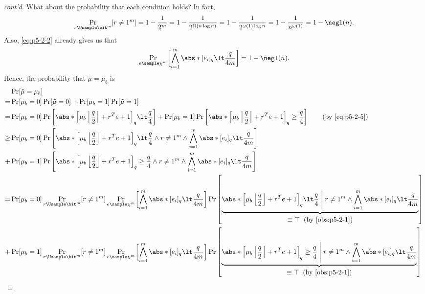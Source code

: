 \begin{answer}[ii]
\begin{proof}[cont'd]
        What about the probability that each condition holds? In fact, 
        \begin{equation}\label{eq:p5-2-8}
            \Pr_{r\Usample\bit^m}[r\neq 1^m] = 1-\frac{1}{2^m}=1-\frac{1}{2^{\Omega(n\log n)}}
            =1-\frac{1}{2^{\omega(1)\log{n}}}=1-\frac{1}{n^{\omega(1)}}=1-\negl(n).
        \end{equation}
        Also, \eqref{eq:p5-2-2} already gives us that
        \begin{equation}\label{eq:p5-2-9}
            \Pr_{e\sample\chi^m}\biggl[ \bigwedge_{i=1}^m \abs*{[e_i]_q} \lt \frac{q}{4m}\biggr] = 1-\negl(n).
        \end{equation}
        Hence, the probability that $\tilde{\mu}=\mu_b$ is
        \begin{align*}
            &\Pr[\tilde{\mu}=\mu_b]\\
            =& \Pr[\mu_b=0]\Pr[\tilde{\mu}=0] + \Pr[\mu_b=1]\Pr[\tilde{\mu}=1]\\
            =& \Pr[\mu_b=0]\Pr\left[\abs*{\left[\mu_b\left\lfloor \frac{q}{2}\right\rfloor +  r^T e + 1\right]_q}\lt \frac{q}{4} \right] 
            + \Pr[\mu_b=1]\Pr\left[\abs*{\left[\mu_b\left\lfloor \frac{q}{2}\right\rfloor +  r^T e + 1\right]_q}\ge \frac{q}{4}\right]
            \qquad (\textrm{by \eqref{eq:p5-2-5}})\\
            \ge& \Pr[\mu_b=0]\Pr\left[\abs*{\left[\mu_b\left\lfloor \frac{q}{2}\right\rfloor +  r^T e + 1\right]_q}\lt \frac{q}{4} \land r\neq 1^m \land \bigwedge_{i=1}^m \abs*{[e_i]_q} \lt \frac{q}{4m} \right] \\
            +& \Pr[\mu_b=1]\Pr\left[\abs*{\left[\mu_b\left\lfloor \frac{q}{2}\right\rfloor +  r^T e + 1\right]_q}\ge \frac{q}{4} \land r\neq 1^m \land \bigwedge_{i=1}^m \abs*{[e_i]_q} \lt \frac{q}{4m} \right]\\
            =& \Pr[\mu_b=0] \Pr_{r\Usample\bit^m}[r\neq 1^m]\Pr_{e\sample\chi^m}\biggl[ \bigwedge_{i=1}^m \abs*{[e_i]_q} \lt \frac{q}{4m}\biggr] \Pr\left[\underbrace{\abs*{\left[\mu_b\left\lfloor \frac{q}{2}\right\rfloor +  r^T e + 1\right]_q}\lt \frac{q}{4} \Biggm\vert r\neq 1^m \land \bigwedge_{i=1}^m \abs*{[e_i]_q} \lt \frac{q}{4m}}_{\begin{gathered}\equiv \top\;\;\textrm{(by \autoref{obs:p5-2-1})}\end{gathered}}\right] \\
            +& \Pr[\mu_b=1] \Pr_{r\Usample\bit^m}[r\neq 1^m]\Pr_{e\sample\chi^m}\biggl[ \bigwedge_{i=1}^m \abs*{[e_i]_q} \lt \frac{q}{4m}\biggr] \Pr\left[\underbrace{\abs*{\left[\mu_b\left\lfloor \frac{q}{2}\right\rfloor +  r^T e + 1\right]_q}\ge \frac{q}{4} \Biggm\vert r\neq 1^m \land \bigwedge_{i=1}^m \abs*{[e_i]_q} \lt \frac{q}{4m}}_{\begin{gathered}\equiv \top\;\;\textrm{(by \autoref{obs:p5-2-1})}\end{gathered}} \right]\\

\end{align*}
\end{proof}
\end{answer}
